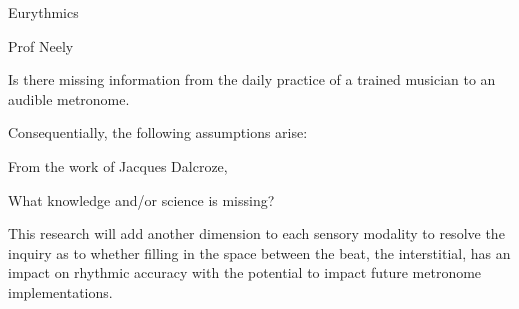 Eurythmics

Prof Neely

Is there missing information from the daily practice of a trained musician to an audible metronome. 

Consequentially, the following assumptions arise:

From the work of Jacques Dalcroze, 

What knowledge and/or science is missing?

This research will add another dimension to each sensory modality to resolve the inquiry as to whether filling in the space between the beat, the interstitial, has an impact on rhythmic accuracy with the potential to impact future metronome implementations. 


